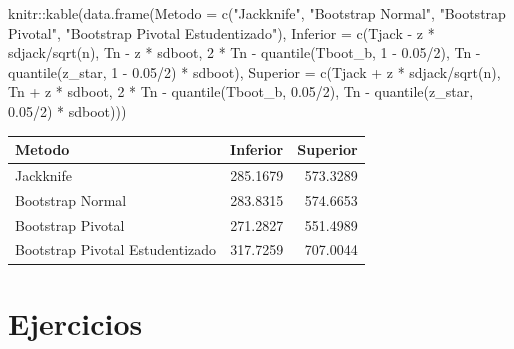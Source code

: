 \documentclass[
  12pt,
]{book}
\newenvironment{Shaded}{\begin{snugshade}}{\end{snugshade}}
\newcommand{\AttributeTok}[1]{\textcolor[rgb]{0.77,0.63,0.00}{#1}}
\newcommand{\DecValTok}[1]{\textcolor[rgb]{0.00,0.00,0.81}{#1}}
\newcommand{\FloatTok}[1]{\textcolor[rgb]{0.00,0.00,0.81}{#1}}
\newcommand{\FunctionTok}[1]{\textcolor[rgb]{0.00,0.00,0.00}{#1}}
\newcommand{\NormalTok}[1]{#1}
\newcommand{\SpecialCharTok}[1]{\textcolor[rgb]{0.00,0.00,0.00}{#1}}
\newcommand{\StringTok}[1]{\textcolor[rgb]{0.31,0.60,0.02}{#1}}
\theoremstyle{definition}
\theoremstyle{definition}
\theoremstyle{definition}
\theoremstyle{definition}
\theoremstyle{remark}
\begin{document}
\begin{Shaded}
\begin{Highlighting}[]
\NormalTok{knitr}\SpecialCharTok{::}\FunctionTok{kable}\NormalTok{(}\FunctionTok{data.frame}\NormalTok{(}\AttributeTok{Metodo =} \FunctionTok{c}\NormalTok{(}\StringTok{"Jackknife"}\NormalTok{, }\StringTok{"Bootstrap Normal"}\NormalTok{,}
    \StringTok{"Bootstrap Pivotal"}\NormalTok{, }\StringTok{"Bootstrap Pivotal Estudentizado"}\NormalTok{),}
    \AttributeTok{Inferior =} \FunctionTok{c}\NormalTok{(Tjack }\SpecialCharTok{{-}}\NormalTok{ z }\SpecialCharTok{*}\NormalTok{ sdjack}\SpecialCharTok{/}\FunctionTok{sqrt}\NormalTok{(n), Tn }\SpecialCharTok{{-}}\NormalTok{ z }\SpecialCharTok{*}
\NormalTok{        sdboot, }\DecValTok{2} \SpecialCharTok{*}\NormalTok{ Tn }\SpecialCharTok{{-}} \FunctionTok{quantile}\NormalTok{(Tboot\_b, }\DecValTok{1} \SpecialCharTok{{-}} \FloatTok{0.05}\SpecialCharTok{/}\DecValTok{2}\NormalTok{),}
\NormalTok{        Tn }\SpecialCharTok{{-}} \FunctionTok{quantile}\NormalTok{(z\_star, }\DecValTok{1} \SpecialCharTok{{-}} \FloatTok{0.05}\SpecialCharTok{/}\DecValTok{2}\NormalTok{) }\SpecialCharTok{*}\NormalTok{ sdboot),}
    \AttributeTok{Superior =} \FunctionTok{c}\NormalTok{(Tjack }\SpecialCharTok{+}\NormalTok{ z }\SpecialCharTok{*}\NormalTok{ sdjack}\SpecialCharTok{/}\FunctionTok{sqrt}\NormalTok{(n), Tn }\SpecialCharTok{+}\NormalTok{ z }\SpecialCharTok{*}
\NormalTok{        sdboot, }\DecValTok{2} \SpecialCharTok{*}\NormalTok{ Tn }\SpecialCharTok{{-}} \FunctionTok{quantile}\NormalTok{(Tboot\_b, }\FloatTok{0.05}\SpecialCharTok{/}\DecValTok{2}\NormalTok{),}
\NormalTok{        Tn }\SpecialCharTok{{-}} \FunctionTok{quantile}\NormalTok{(z\_star, }\FloatTok{0.05}\SpecialCharTok{/}\DecValTok{2}\NormalTok{) }\SpecialCharTok{*}\NormalTok{ sdboot)))}
\end{Highlighting}
\end{Shaded}

\begin{tabular}{l|r|r}
\hline
Metodo & Inferior & Superior\\
\hline
Jackknife & 285.1679 & 573.3289\\
\hline
Bootstrap Normal & 283.8315 & 574.6653\\
\hline
Bootstrap Pivotal & 271.2827 & 551.4989\\
\hline
Bootstrap Pivotal Estudentizado & 317.7259 & 707.0044\\
\hline
\end{tabular}

\hypertarget{ejercicios-1}{%
\section{Ejercicios}\label{ejercicios-1}}
\end{document}
